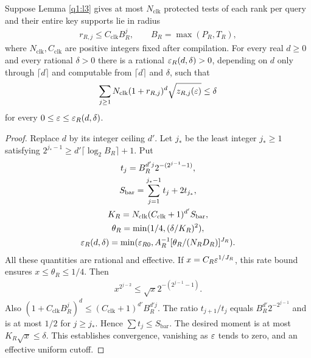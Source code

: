 \begin{lemma}\label{q1:l1.1}

Suppose Lemma \ref{q1:l3} gives at most \(N_{\mathrm{clk}}\) protected tests of each rank per query and their entire key supports lie in radius
\[
\begin{gathered}
r_{R,j} \le  C_{\mathrm{clk}} B_{R}^{j},\qquad B_{R} = \max (P_{R},T_{R}),
\end{gathered}
\]
where \(N_{\mathrm{clk}},C_{\mathrm{clk}}\) are positive integers fixed after compilation. For every real \(d\ge 0\) and every rational \(\delta>0\) there is a rational \(\varepsilon_{R}(d,\delta)>0\), depending on \(d\) only through \(\lceil d\rceil\) and computable from \(\lceil d\rceil\) and \(\delta\), such that
\[
\begin{gathered}
\sum _{j\ge 1} N_{\mathrm{clk}} (1+r_{R,j})^{d} \sqrt{z_{R,j}(\varepsilon)} \le  \delta
\end{gathered}
\]
for every \(0 \le  \varepsilon \le  \varepsilon_{R}(d,\delta)\).

\end{lemma}
\begin{proof}
Replace \(d\) by its integer ceiling \(d'\). Let \(j_{*}\) be the least integer \(j_{*} \ge  1\) satisfying \(2^{j_{*}-1} \ge  d' \lceil \log _{2} B_{R}\rceil+1\). Put
\[
\begin{gathered}
t_{j} = B_{R}^{d' j} 2^{-(2^{j-1}-1)}, \\ S_{\mathrm{bar}} = \sum _{j=1}^{j_{*}-1} t_{j} + 2t_{j_{*}}, \\ K_{R} = N_{\mathrm{clk}}(C_{\mathrm{clk}}+1)^{d'} S_{\mathrm{bar}}, \\ \theta_{R} = \min (1/4, (\delta/K_{R})^{2}), \\ \varepsilon_{R}(d,\delta) = \min (\varepsilon_{R0}, A_{R}^{-1}[\theta_{R}/(N_{R} D_{R})]^{J_{R}}).
\end{gathered}
\]
All these quantities are rational and effective. If \(x=C_{R} \varepsilon^{1/J_{R}}\), this rate bound ensures \(x\le \theta_{R}\le 1/4\). Then
\[
\begin{gathered}
x^{2^{j-2}} \le  \sqrt{x} 2^{-(2^{j-1}-1)}.
\end{gathered}
\]
Also \((1+C_{\mathrm{clk}} B_{R}^{j})^{d} \le  (C_{\mathrm{clk}}+1)^{d'} B_{R}^{d'j}\). The ratio \(t_{j+1}/t_{j}\) equals \(B_{R}^{d'} 2^{-2^{j-1}}\) and is at most \(1/2\) for \(j\ge j_{*}\). Hence \(\sum  t_{j} \le  S_{\mathrm{bar}}\). The desired moment is at most \(K_{R} \sqrt{x} \le  \delta\). This establishes convergence, vanishing as \(\varepsilon\) tends to zero, and an effective uniform cutoff. 
\end{proof}

